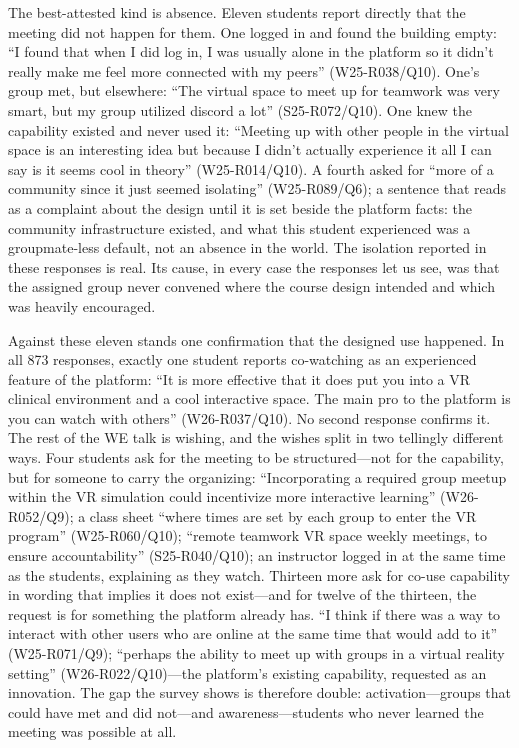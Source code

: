 The best-attested kind is absence. Eleven students report directly that
the meeting did not happen for them. One logged in and found the
building empty: ``I found that when I did log in, I was usually alone
in the platform so it didn't really make me feel more connected with my
peers'' (W25-R038/Q10). One's group met, but elsewhere: ``The virtual
space to meet up for teamwork was very smart, but my group utilized
discord a lot'' (S25-R072/Q10). One knew the capability existed and
never used it: ``Meeting up with other people in the virtual space is
an interesting idea but because I didn't actually experience it all I
can say is it seems cool in theory'' (W25-R014/Q10). A fourth asked for
``more of a community since it just seemed isolating''
(W25-R089/Q6); a sentence that reads as a complaint about the design
until it is set beside the platform facts: the community infrastructure
existed, and what this student experienced was a groupmate-less
default, not an absence in the world. The isolation reported in these
responses is real. Its cause, in every case the responses let us see,
was that the assigned group never convened where the course design
intended and which was heavily encouraged.

Against these eleven stands one confirmation that the designed use
happened. In all 873 responses, exactly one student reports co-watching
as an experienced feature of the platform: ``It is more effective that
it does put you into a VR clinical environment and a cool interactive
space. The main pro to the platform is you can watch with others''
(W26-R037/Q10). No second response confirms it. The rest of the WE talk
is wishing, and the wishes split in two tellingly different ways. Four
students ask for the meeting to be structured---not for the capability,
but for someone to carry the organizing: ``Incorporating a required
group meetup within the VR simulation could incentivize more
interactive learning'' (W26-R052/Q9); a class sheet ``where times are
set by each group to enter the VR program'' (W25-R060/Q10); ``remote
teamwork VR space weekly meetings, to ensure accountability''
(S25-R040/Q10); an instructor logged in at the same time as the
students, explaining as they watch. Thirteen more ask for co-use
capability in wording that implies it does not exist---and for twelve
of the thirteen, the request is for something the platform already has.
``I think if there was a way to interact with other users who are
online at the same time that would add to it'' (W25-R071/Q9); ``perhaps
the ability to meet up with groups in a virtual reality setting''
(W26-R022/Q10)---the platform's existing capability, requested as an
innovation. The gap the survey shows is therefore double:
activation---groups that could have met and did not---and
awareness---students who never learned the meeting was possible at all.

